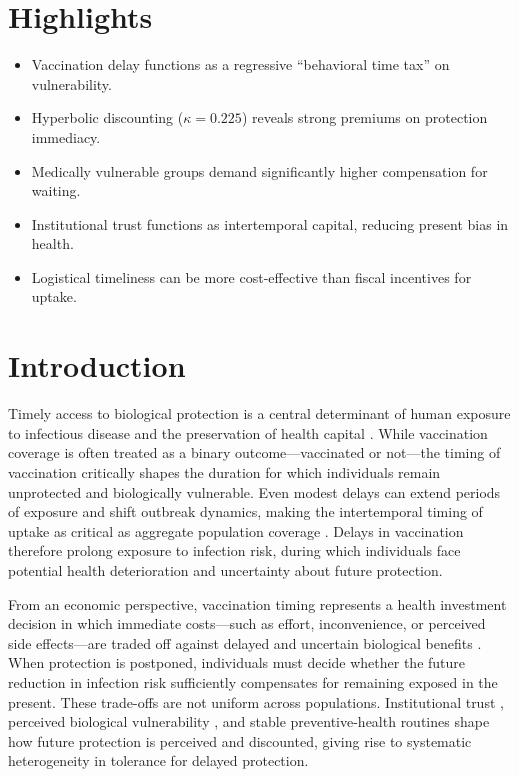 \documentclass[preprint,12pt,authoryear]{elsarticle}
\begin{document}
\section*{Highlights}
\begin{itemize}
    \item Vaccination delay functions as a regressive ``behavioral time tax'' on vulnerability.
    \item Hyperbolic discounting ($\kappa = 0.225$) reveals strong premiums on protection immediacy.
    \item Medically vulnerable groups demand significantly higher compensation for waiting.
    \item Institutional trust functions as intertemporal capital, reducing present bias in health.
    \item Logistical timeliness can be more cost-effective than fiscal incentives for uptake.
\end{itemize}

\section{Introduction}
Timely access to biological protection is a central determinant of human exposure to infectious disease and the preservation of health capital \citep{Castioni2024, Shankar2024}. While vaccination coverage is often treated as a binary outcome—vaccinated or not—the timing of vaccination critically shapes the duration for which individuals remain unprotected and biologically vulnerable. Even modest delays can extend periods of exposure and shift outbreak dynamics, making the intertemporal timing of uptake as critical as aggregate population coverage \citep{Rasmussen2021}. Delays in vaccination therefore prolong exposure to infection risk, during which individuals face potential health deterioration and uncertainty about future protection. 

From an economic perspective, vaccination timing represents a health investment decision in which immediate costs—such as effort, inconvenience, or perceived side effects—are traded off against delayed and uncertain biological benefits \citep{Frederick2002}. When protection is postponed, individuals must decide whether the future reduction in infection risk sufficiently compensates for remaining exposed in the present. These trade-offs are not uniform across populations. Institutional trust \citep{Krastev2023}, perceived biological vulnerability \citep{Bok2024}, and stable preventive-health routines \citep{Kumar2025} shape how future protection is perceived and discounted, giving rise to systematic heterogeneity in tolerance for delayed protection.
\end{document}
